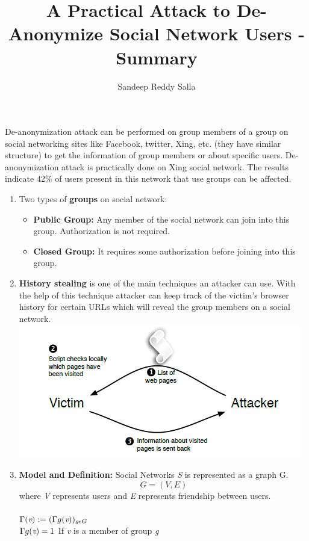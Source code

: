 \documentclass{article}
\title{A Practical Attack to De-Anonymize Social Network Users - Summary}
\author{Sandeep Reddy Salla}
\begin{document}
\maketitle

De-anonymization attack can be performed on group members of a group on social networking sites like Facebook, twitter, Xing, etc. (they have similar structure) to get the information of group members or about specific users. De-anonymization attack is practically done on Xing social network. The results indicate 42\% of users present in this network that use groups can be affected.\\
\begin{enumerate}
\item Two types of \textbf{groups} on social network:
	\begin{itemize}
	\item 	\textbf{Public Group:}  Any member of the social network can join into this group. Authorization is not required.
	\item \textbf{Closed Group:} It requires some authorization before joining into this group.
	\end{itemize}


\item \textbf{History stealing} is one of the main techniques an attacker can use. With the help of this technique attacker can keep track of the victim’s browser history for certain URLs which will reveal the group members on a social network.\\

\includegraphics{HistoryStealing.png}

\item \textbf{Model and Definition:}
Social Networks \emph{S} is represented as a graph G.
	\begin{equation}
		G = (V,E)
	\end{equation}
where \emph{V} represents users and \emph{E} represents friendship between users.\\
	\\$\Gamma (\emph{v}) := (\Gamma g(\emph{v}))_ {g\epsilon G}$	
\\$\Gamma g(\emph{v})=1$
If \emph{v} is a member of group \emph{g}


\end{enumerate}
\end{document}

